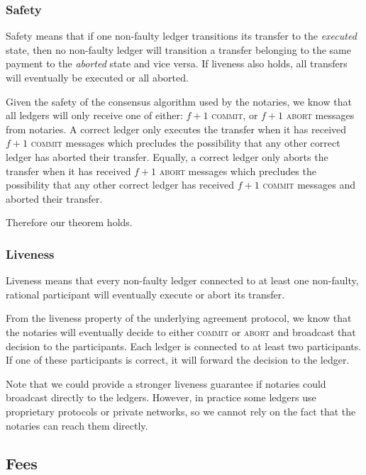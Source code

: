 \documentclass[letterpaper,twocolumn,10pt]{article}
\begin{document}
\subsubsection{Safety}

Safety means that if one non-faulty ledger transitions its transfer to the \textit{executed} state, then no non-faulty ledger will transition a transfer belonging to the same payment to the \textit{aborted} state and vice versa. If liveness also holds, all transfers will eventually be executed or all aborted.

Given the safety of the consensus algorithm used by the notaries, 
we know that all ledgers will only receive one of either: $f + 1$ \textsc{commit}, or $f + 1$ \textsc{abort} messages from notaries. A correct ledger only executes the transfer when it has received $f + 1$ \textsc{commit} messages which precludes the possibility that any other correct ledger has aborted their transfer. Equally, a correct ledger only aborts the transfer when it has received $f + 1$ \textsc{abort} messages which precludes the possibility that any other correct ledger has received $f + 1$ \textsc{commit} messages and aborted their transfer.

Therefore our theorem holds.

\subsubsection{Liveness}

Liveness means that every non-faulty ledger connected to at least one non-faulty, rational participant will eventually execute or abort its transfer.

From the liveness property of the underlying agreement protocol, we know that the notaries will eventually decide to either \textsc{commit} or \textsc{abort} and broadcast that decision to the participants. Each ledger is connected to at least two participants. If one of these participants is correct, it will forward the decision to the ledger.

Note that we could provide a stronger liveness guarantee if notaries could broadcast directly to the ledgers. However, in practice some ledgers use proprietary protocols or private networks, so we cannot rely on the fact that the notaries can reach them directly.



\subsection{Fees}
\label{subsec:fees}
\end{document}
